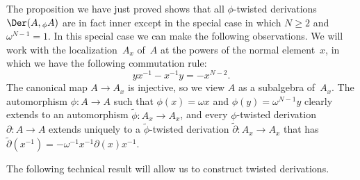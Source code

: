 The proposition we have just proved shows that all $\phi$-twisted derivations
$\Der(A,{}_\phi A)$ are in fact inner except in the special case in which
$N\geq2$ and $\omega^{N-1}=1$. In this special case we can make the
following observations. We will work with the localization~$A_x$ of~$A$ at
the powers of the normal element~$x$, in which we have the following
commutation rule:
  \[
  yx^{-1}-x^{-1}y = -x^{N-2}.
  \]
The canonical map $A\to A_x$ is injective, so we view $A$ as a subalgebra
of~$A_x$.
The automorphism $\phi:A\to A$ such that $\phi(x)=\omega x$ and
$\phi(y)=\omega^{N-1}y$ clearly extends to an automorphism
$\tilde\phi:A_x\to A_x$, and every $\phi$-twisted derivation
$\partial:A\to A$ extends uniquely to a $\tilde\phi$-twisted derivation
$\tilde\partial:A_x\to A_x$ that has $\tilde\partial(x^{-1}) =
-\omega^{-1}x^{-1}\partial(x)x^{-1}$.

The following technical result will allow us to construct twisted
derivations.

